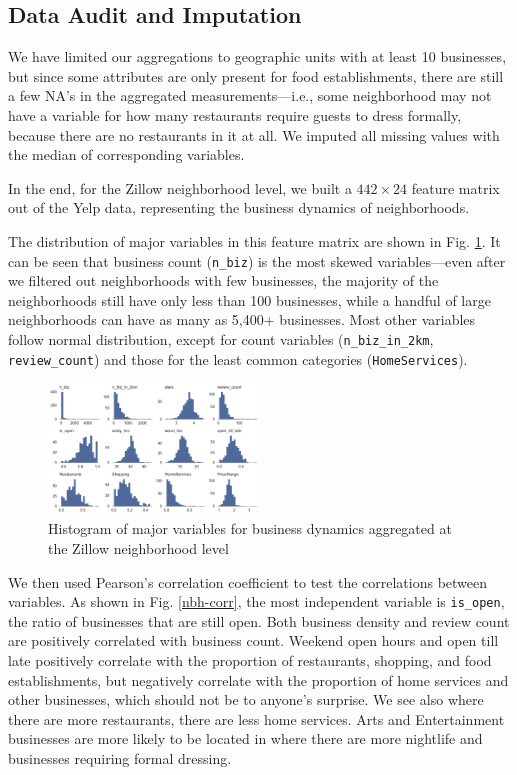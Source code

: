 \documentclass[compsoc]{IEEEtran}
\let\MYoriglatexcaption\caption
\renewcommand{\caption}[2][\relax]{\MYoriglatexcaption[#2]{#2}}
\begin{document}
\subsection{Data Audit and Imputation}

We have limited our aggregations to geographic units with at least 10 businesses, but since some attributes are only present for food establishments, there are still a few NA's in the aggregated measurements---i.e., some neighborhood may not have a variable for how many restaurants require guests to dress formally, because there are no restaurants in it at all. We imputed all missing values with the median of corresponding variables.

In the end, for the Zillow neighborhood level, we built a $442 \times 24$ feature matrix out of the Yelp data, representing the business dynamics of neighborhoods.

The distribution of major variables in this feature matrix are shown in Fig. \ref{nbh-histo}. It can be seen that business count (\texttt{n\_biz}) is the most skewed variables---even after we filtered out neighborhoods with few businesses, the majority of the neighborhoods still have only less than 100 businesses, while a handful of large neighborhoods can have as many as 5,400+ businesses. Most other variables follow normal distribution, except for count variables (\texttt{n\_biz\_in\_2km}, \texttt{review\_count}) and those for the least common categories (\texttt{HomeServices}).

\begin{figure}[h]
  \hspace{-.5em}
    \includegraphics[width=0.5\textwidth]{nbh-histo}
  \caption{Histogram of major variables for business dynamics aggregated at the Zillow neighborhood level}
  \label{nbh-histo}
\end{figure}

We then used Pearson's correlation coefficient to test the correlations between variables. As shown in Fig. \ref{nbh-corr}, the most independent variable is \texttt{is\_open}, the ratio of businesses that are still open. Both business density and review count are positively correlated with business count. Weekend open hours and open till late positively correlate with the proportion of restaurants, shopping, and food establishments, but negatively correlate with the proportion of home services and other businesses, which should not be to anyone's surprise. We see also where there are more restaurants, there are less home services. Arts and Entertainment businesses are more likely to be located in where there are more nightlife and businesses requiring formal dressing.
\end{document}
